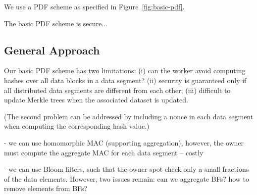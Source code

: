 We use a PDF scheme as specified in Figure~\ref{fig:basic-pdf}.

\begin{Lem}
The basic PDF scheme is secure... 
\end{Lem}

\subsection{General Approach} \label{sect:pdf-general}

Our basic PDF scheme has two limitations: (i) can the worker avoid computing hashes over all data blocks in a data segment? (ii) security is guaranteed only if all distributed data segments are different from each other; (iii) difficult to update Merkle trees when the associated dataset is updated.

(The second problem can be addressed by including a nonce in each data segment when computing the corresponding hash value.)

- we can use homomorphic MAC (supporting aggregation), however, the owner must compute the aggregate MAC for each data segment -- costly

- we can use Bloom filters, such that the owner spot check only a small fractions of the data elements. However, two issues remain: can we aggregate BFs? how to remove elements from BFs?

